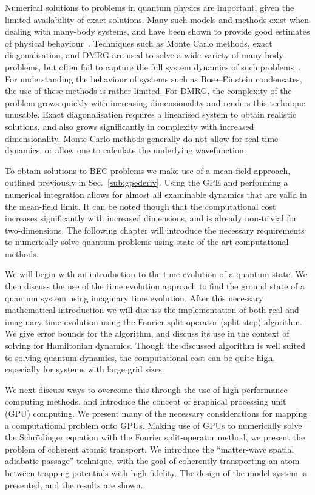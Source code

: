 Numerical solutions to problems in quantum physics are important, given the limited availability of exact solutions. Many such models and methods exist when dealing with many-body systems, and have been shown to provide good estimates of physical behaviour~\cite{BK:Krauth_2006}. Techniques such as Monte Carlo methods, exact diagonalisation, and DMRG are used to solve a wide variety of many-body problems, but often fail to capture the full system dynamics of such problems~\cite{NUM:Schollwock_rmp_2005}. For understanding the behaviour of systems such as Bose--Einstein condensates, the use of these methods is rather limited. For DMRG, the complexity of the problem grows quickly with increasing dimensionality and renders this technique unusable. Exact diagonalisation requires a linearised system to obtain realistic solutions, and also grows significantly in complexity with increased dimensionality. Monte Carlo methods generally do not allow for real-time dynamics, or allow one to calculate the underlying wavefunction.

To obtain solutions to BEC problems we make use of a mean-field approach, outlined previously in Sec.~\ref{sub:gpederiv}. Using the GPE and performing a numerical integration allows for almost all examinable dynamics that are valid in the mean-field limit. It can be noted though that the computational cost increases significantly with increased dimensions, and is already non-trivial for two-dimensions. The following chapter will introduce the necessary requirements to numerically solve quantum problems using state-of-the-art computational methods.

We will begin with an introduction to the time evolution of a quantum state. We then discuss the use of the time evolution approach to find the ground state of a quantum system using imaginary time evolution. After this necessary mathematical introduction we will discuss the implementation of both real and imaginary time evolution using the Fourier split-operator (split-step) algorithm. We give error bounds for the algorithm, and discuss its use in the context of solving for Hamiltonian dynamics. Though the discussed algorithm is well suited to solving quantum dynamics, the computational cost can be quite high, especially for systems with large grid sizes.

We next discuss ways to overcome this through the use of high performance computing methods, and introduce the concept of graphical processing unit (GPU) computing. We present many of the necessary considerations for mapping a computational problem onto GPUs. Making use of GPUs to numerically solve the Schr\"odinger equation with the Fourier split-operator method, we present the problem of coherent atomic transport. We introduce the ``matter-wave spatial adiabatic passage'' technique, with the goal of coherently transporting an atom between trapping potentials with high fidelity. The design of the model system is presented, and the results are shown.


